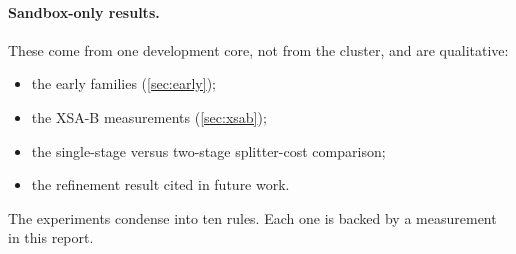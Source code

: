 \documentclass[11pt,a4paper]{article}
\newcommand{\XSAB}{\textsf{XSA-B}}
\begin{document}
\paragraph{Sandbox-only results.}
These come from one development core, not from the cluster, and are qualitative:
\begin{itemize}
\item the early families (\cref{sec:early});
\item the \XSAB{} measurements (\cref{sec:xsab});
\item the single-stage versus two-stage splitter-cost comparison;
\item the refinement result cited in future work.
\end{itemize}


\label{sec:rules}
The experiments condense into ten rules. Each one is backed by a measurement in this report.
\end{document}
